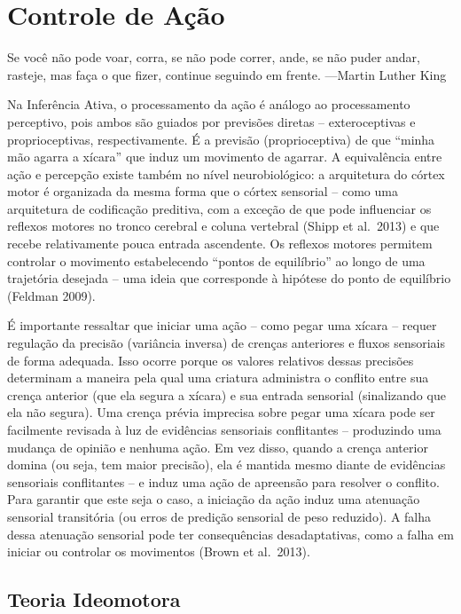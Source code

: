 \documentclass[
  12pt,
]{book}
\begin{document}
\hypertarget{controle-de-auxe7uxe3o}{%
\section{Controle de Ação}\label{controle-de-auxe7uxe3o}}

Se você não pode voar, corra, se não pode correr, ande, se não puder andar, rasteje, mas faça o que fizer, continue seguindo em frente.
---Martin Luther King

Na Inferência Ativa, o processamento da ação é análogo ao processamento perceptivo, pois ambos são guiados por previsões diretas -- exteroceptivas e proprioceptivas, respectivamente. É a previsão (proprioceptiva) de que ``minha mão agarra a xícara'' que induz um movimento de agarrar. A equivalência entre ação e percepção existe também no nível neurobiológico: a arquitetura do córtex motor é organizada da mesma forma que o córtex sensorial -- como uma arquitetura de codificação preditiva, com a exceção de que pode influenciar os reflexos motores no tronco cerebral e coluna vertebral (Shipp et al.~2013) e que recebe relativamente pouca entrada ascendente. Os reflexos motores permitem controlar o movimento estabelecendo ``pontos de equilíbrio'' ao longo de uma trajetória desejada -- uma ideia que corresponde à hipótese do ponto de equilíbrio (Feldman 2009).

É importante ressaltar que iniciar uma ação -- como pegar uma xícara -- requer regulação da precisão (variância inversa) de crenças anteriores e fluxos sensoriais de forma adequada. Isso ocorre porque os valores relativos dessas precisões determinam a maneira pela qual uma criatura administra o conflito entre sua crença anterior (que ela segura a xícara) e sua entrada sensorial (sinalizando que ela não segura). Uma crença prévia imprecisa sobre pegar uma xícara pode ser facilmente revisada à luz de evidências sensoriais conflitantes -- produzindo uma mudança de opinião e nenhuma ação. Em vez disso, quando a crença anterior domina (ou seja, tem maior precisão), ela é mantida mesmo diante de evidências sensoriais conflitantes -- e induz uma ação de apreensão para resolver o conflito. Para garantir que este seja o caso, a iniciação da ação induz uma atenuação sensorial transitória (ou erros de predição sensorial de peso reduzido). A falha dessa atenuação sensorial pode ter consequências desadaptativas, como a falha em iniciar ou controlar os movimentos (Brown et al.~2013).

\hypertarget{teoria-ideomotora}{%
\subsection{Teoria Ideomotora}\label{teoria-ideomotora}}
\end{document}
